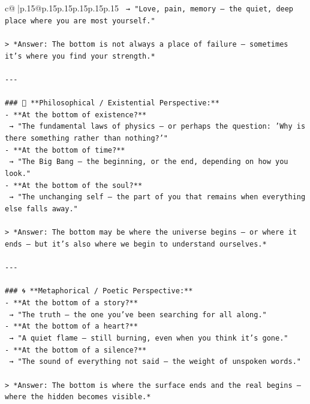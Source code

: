\documentclass{article}
\begin{document}
{\begin{supertabular}{c@{$\;$}|p{.15\linewidth}@{}p{.15\linewidth}p{.15\linewidth}p{.15\linewidth}p{.15\linewidth}p{.15\linewidth}}
{{{\texttt{  → "Love, pain, memory — the quiet, deep place where you are most yourself."} \\
\\ 
\texttt{> *Answer: The bottom is not always a place of failure — sometimes it’s where you find your strength.*} \\
\\ 
\texttt{{-}{-}{-}} \\
\\ 
\texttt{\#\#\# 🌌 **Philosophical / Existential Perspective:**} \\
\texttt{{-} **At the bottom of existence?**  } \\
\texttt{  → "The fundamental laws of physics — or perhaps the question: 'Why is there something rather than nothing?'"} \\
\texttt{{-} **At the bottom of time?**  } \\
\texttt{  → "The Big Bang — the beginning, or the end, depending on how you look."} \\
\texttt{{-} **At the bottom of the soul?**  } \\
\texttt{  → "The unchanging self — the part of you that remains when everything else falls away."} \\
\\ 
\texttt{> *Answer: The bottom may be where the universe begins — or where it ends — but it’s also where we begin to understand ourselves.*} \\
\\ 
\texttt{{-}{-}{-}} \\
\\ 
\texttt{\#\#\# 🌀 **Metaphorical / Poetic Perspective:**} \\
\texttt{{-} **At the bottom of a story?**  } \\
\texttt{  → "The truth — the one you’ve been searching for all along."} \\
\texttt{{-} **At the bottom of a heart?**  } \\
\texttt{  → "A quiet flame — still burning, even when you think it’s gone."} \\
\texttt{{-} **At the bottom of a silence?**  } \\
\texttt{  → "The sound of everything not said — the weight of unspoken words."} \\
\\ 
\texttt{> *Answer: The bottom is where the surface ends and the real begins — where the hidden becomes visible.*} \\
\\ 
}}}
\end{supertabular}}
\end{document}
